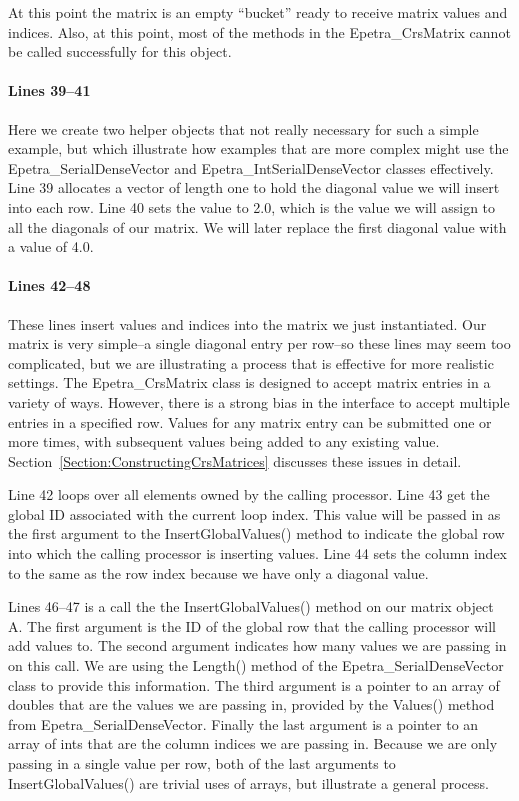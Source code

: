 \documentclass[12pt,relax]{EpetraUserGuide}
\newcommand{\serialdensevector}{Epetra\_SerialDenseVector}
\newcommand{\intserialdensevector}{Epetra\_IntSerialDenseVector}
\newcommand{\crsmatrix}{Epetra\_CrsMatrix}
\begin{document}
At this point the matrix is an empty ``bucket'' ready to receive
matrix values and indices.  Also, at this point, most of the methods
in the \crsmatrix{} cannot be called successfully for this object.
\paragraph{Lines 39--41}
Here we create two helper objects that not really necessary for such a
simple example, but which illustrate how examples that are more
complex might
use the \serialdensevector{} and \intserialdensevector{} classes
effectively.
Line 39 allocates a vector of length one to hold the diagonal value
we will insert into each row.  Line 40 sets the value to 2.0, which is
the value we will assign to all the diagonals of our matrix.  We will
later replace the first diagonal value with a value of 4.0.
\paragraph{Lines 42--48}
These lines insert values and indices into the matrix we just
instantiated.  Our matrix is very simple--a single diagonal entry per
row--so these lines may seem too complicated, but we are illustrating
a process that is effective for more realistic settings.  
The \crsmatrix{} class is
designed to accept matrix entries in a variety of ways.  However,
there is a strong bias in the interface to accept multiple entries in
a specified row.  Values for any matrix entry can be submitted one or more times,
with subsequent values being added to any existing value.
Section~\ref{Section:ConstructingCrsMatrices} discusses these issues
in detail.

Line 42 loops over all elements
owned by the calling processor.  Line 43 get the global ID associated
with the current loop index.  This value will be passed in as the
first argument to the 
InsertGlobalValues() method to indicate the global row into which the calling
processor is inserting values.  Line 44 sets the column index to the
same as the row index because we have only a diagonal value.  

Lines 46--47 is a call the the InsertGlobalValues() method on our matrix
object A.  The first argument is the ID of the global row that the
calling processor will add values to.  The second argument indicates
how many values we are passing in on this call.  We are using the
Length() method of the \serialdensevector{} class to provide this
information.  The third argument is a pointer to an array of doubles
that are the values we are passing in,
provided by the Values() method from \serialdensevector{}.  Finally
the last argument is a pointer to an array of ints that are the column
indices we are passing in.  Because we are only passing in a single
value per row, both of the last arguments to InsertGlobalValues() are trivial
uses of arrays, but illustrate a general process.
\end{document}
